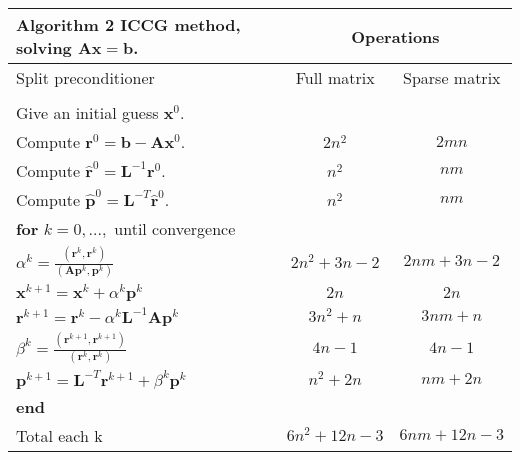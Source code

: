 \documentclass[a4paper,10pt]{report}
\begin{document}
 \begin{table}[!h]
\begin{tabular}{ |l|c|c| } 
\hline
  \textbf{Algorithm 2} ICCG method, solving $\mathbf{A}\mathbf{x}=\mathbf{b}$.& \multicolumn{2}{|c|}{Operations}\\
  \hline
Split preconditioner &Full matrix&Sparse matrix\\
 \hline
&&\\
Give an initial guess $\mathbf{x}^0$. &&\\
Compute $\mathbf{r}^0=\mathbf{b}-\mathbf{A}\mathbf{x}^0$.&$2n^2$&$2mn$\\
Compute $\hat{\mathbf{r}}^0=\mathbf{L}^{-1}\mathbf{r}^0$.&$n^2$&$nm$\\
Compute $\hat{\mathbf{p}}^0=\mathbf{L}^{-T}\hat{\mathbf{r}}^0$.&$n^2$&$nm$\\
\hline
\hspace{0.5cm}\textbf{for} $k=0,...,$ until convergence&&\\
 \hspace{1cm} $\alpha^k=\frac{(\mathbf{r}^{k},\mathbf{r}^{k})}{(\mathbf{A}\mathbf{p}^k,\mathbf{p}^k)}$&$2n^2+3n-2$&$2nm+3n-2$\\
\hspace{1cm} $\mathbf{x}^{k+1}=\mathbf{x}^k+\alpha^k\mathbf{p}^k$&$2n$&$2n$\\
\hspace{1cm}$\mathbf{r}^{k+1}=\mathbf{r}^k-\alpha^k\mathbf{L}^{-1}\mathbf{A}\mathbf{p}^k$&$3n^2+n$&$3nm+n$\\
\hspace{1cm}$ \beta^k=\frac{(\mathbf{r}^{k+1},\mathbf{r}^{k+1})}{(\mathbf{r}^k,\mathbf{r}^k)}$&$4n-1$&$4n-1$\\
\hspace{1cm}$\mathbf{p}^{k+1}=\mathbf{L}^{-T}\mathbf{r}^{k+1}+\beta^k\mathbf{p}^k$&$n^2+2n$&$nm+2n$\\
\hspace{0.5cm}\textbf{end}&&\\
\hline
Total each k&$6n^2+12n-3$&$6nm+12n-3$\\
\hline
\end{tabular}
\end{table}
\end{document}
